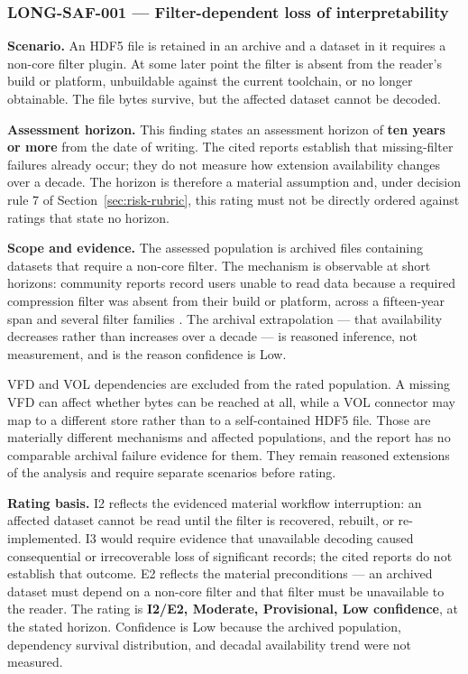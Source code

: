 \documentclass[../main.tex]{subfiles}
\begin{document}
\subsubsection*{LONG-SAF-001 --- Filter-dependent loss of interpretability}

\noindent\textbf{Scenario.}
An HDF5 file is retained in an archive and a dataset in it requires a non-core
filter plugin. At some later point the filter is absent from the reader's build
or platform, unbuildable against the current toolchain, or no longer
obtainable. The file bytes survive, but the affected dataset cannot be decoded.

\noindent\textbf{Assessment horizon.}
This finding states an assessment horizon of \textbf{ten years or more} from
the date of writing. The cited reports establish that missing-filter failures
already occur; they do not measure how extension availability changes over a
decade. The horizon is therefore a material assumption and, under decision
rule 7 of Section~\ref{sec:risk-rubric}, this rating must not be directly
ordered against ratings that state no horizon.

\noindent\textbf{Scope and evidence.}
The assessed population is archived files containing datasets that require a
non-core filter. The mechanism is observable at short horizons: community
reports record users unable to read data because a required compression filter
was absent from their build or platform, across a fifteen-year span and several
filter families
\cite{forum-filter-compressed-2756,forum-filter-h5dump-3396,
forum-filter-dynamic-4047,forum-filter-lzo-4102}. The archival extrapolation
--- that availability decreases rather than increases over a decade --- is
reasoned inference, not measurement, and is the reason confidence is Low.

VFD and VOL dependencies are excluded from the rated population. A missing VFD
can affect whether bytes can be reached at all, while a VOL connector may map
to a different store rather than to a self-contained HDF5 file. Those are
materially different mechanisms and affected populations, and the report has
no comparable archival failure evidence for them. They remain reasoned
extensions of the analysis and require separate scenarios before rating.

\noindent\textbf{Rating basis.}
I2 reflects the evidenced material workflow interruption: an affected dataset
cannot be read until the filter is recovered, rebuilt, or re-implemented. I3
would require evidence that unavailable decoding caused consequential or
irrecoverable loss of significant records; the cited reports do not establish
that outcome. E2 reflects the material preconditions --- an archived dataset
must depend on a non-core filter and that filter must be unavailable to the
reader. The rating is \textbf{I2/E2, Moderate, Provisional, Low confidence}, at
the stated horizon. Confidence is Low because the archived population,
dependency survival distribution, and decadal availability trend were not
measured.
\end{document}
